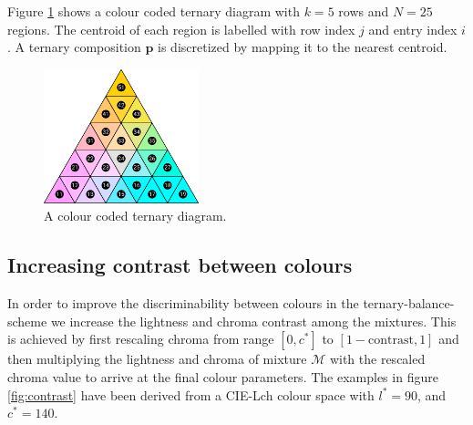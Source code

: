 \documentclass[parskip=half]{scrartcl}
\begin{document}
\begin{appendix}
Figure \ref{fig:tern_quant} shows a colour coded ternary diagram with $k = 5$ rows and $N = 25$ regions. The centroid of each region is labelled with row index $j$ and entry index $i$. A ternary composition $\textbf{p}$ is discretized by mapping it to the nearest centroid.

\begin{figure}[!htb]
  \centering
  \includegraphics[width = 0.4\textwidth]{./fig/tern_quant.pdf}
  \caption{A colour coded ternary diagram.}
  \label{fig:tern_quant}
\end{figure}

\clearpage

\subsection{Increasing contrast between colours}
\label{ssec:lboost}

In order to improve the discriminability between colours in the ternary-balance-scheme we increase the lightness and chroma contrast among the mixtures. This is achieved by first rescaling chroma from range $[0, c^*]$ to $[1-\text{contrast}, 1]$ and then multiplying the lightness and chroma of mixture $\mathscr{M}$ with the rescaled chroma value to arrive at the final colour parameters. The examples in figure \ref{fig:contrast} have been derived from a CIE-Lch colour space with $l^*=90$, and $c^*=140$.


\end{appendix}
\end{document}
